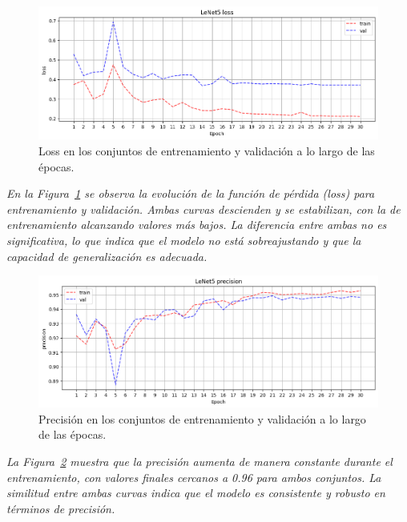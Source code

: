\documentclass[conference]{IEEEtran}
\begin{document}
\begin{figure}[H]
    \centering
    \includegraphics[width=0.95\linewidth]{graphics-raw/raw-loss-train_val.png}
    \caption{Loss en los conjuntos de entrenamiento y validación a lo largo de las épocas.}
    \label{fig:raw-loss-train_val}
\end{figure}
\noindent\textit{
En la Figura~\ref{fig:raw-loss-train_val} se observa la evolución de la función de pérdida (loss) para entrenamiento y validación. Ambas curvas descienden y se estabilizan, con la de entrenamiento alcanzando valores más bajos. La diferencia entre ambas no es significativa, lo que indica que el modelo no está sobreajustando y que la capacidad de generalización es adecuada.
}

\begin{figure}[H]
    \centering
    \includegraphics[width=0.95\linewidth]{graphics-raw/raw-precision-train_val.png}
    \caption{Precisión en los conjuntos de entrenamiento y validación a lo largo de las épocas.}
    \label{fig:raw-precision-train_val}
\end{figure}
\noindent\textit{
La Figura~\ref{fig:raw-precision-train_val} muestra que la precisión aumenta de manera constante durante el entrenamiento, con valores finales cercanos a 0.96 para ambos conjuntos. La similitud entre ambas curvas indica que el modelo es consistente y robusto en términos de precisión.
}
\end{document}
